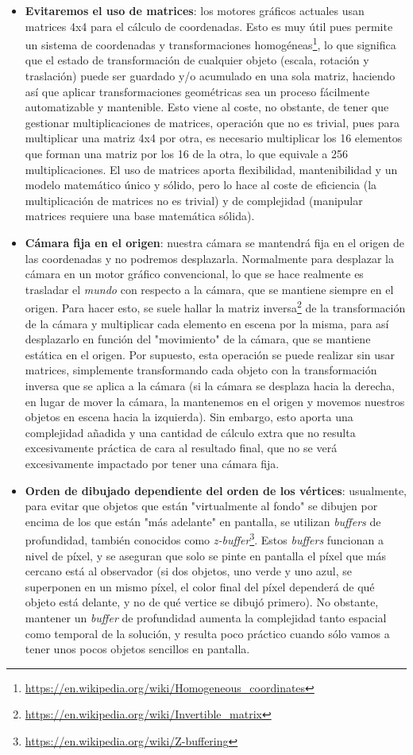 \begin{itemize}
	\item \textbf{Evitaremos el uso de matrices}: los motores gráficos actuales usan matrices 4x4 para el cálculo de coordenadas. Esto es muy útil pues permite un sistema de coordenadas y transformaciones homogéneas\footnote{\url{https://en.wikipedia.org/wiki/Homogeneous_coordinates}}, lo que significa que el estado de transformación de cualquier objeto (escala, rotación y traslación) puede ser guardado y/o acumulado en una sola matriz, haciendo así que aplicar transformaciones geométricas sea un proceso fácilmente automatizable y mantenible. Esto viene al coste, no obstante, de tener que gestionar multiplicaciones de matrices, operación que no es trivial, pues para multiplicar una matriz 4x4 por otra, es necesario multiplicar los 16 elementos que forman una matriz por los 16 de la otra, lo que equivale a 256 multiplicaciones. El uso de matrices aporta flexibilidad, mantenibilidad y un modelo matemático único y sólido, pero lo hace al coste de eficiencia (la multiplicación de matrices no es trivial) y de complejidad (manipular matrices requiere una base matemática sólida).
	\item \textbf{Cámara fija en el origen}: nuestra cámara se mantendrá fija en el origen de las coordenadas y no podremos desplazarla. Normalmente para desplazar la cámara en un motor gráfico convencional, lo que se hace realmente es trasladar el \emph{mundo} con respecto a la cámara, que se mantiene siempre en el origen. Para hacer esto, se suele hallar la matriz inversa\footnote{\url{https://en.wikipedia.org/wiki/Invertible_matrix}} de la transformación de la cámara y multiplicar cada elemento en escena por la misma, para así desplazarlo en función del "movimiento" de la cámara, que se mantiene estática en el origen. Por supuesto, esta operación se puede realizar sin usar matrices, simplemente transformando cada objeto con la transformación inversa que se aplica a la cámara (si la cámara se desplaza hacia la derecha, en lugar de mover la cámara, la mantenemos en el origen y movemos nuestros objetos en escena hacia la izquierda). Sin embargo, esto aporta una complejidad añadida y una cantidad de cálculo extra que no resulta excesivamente práctica de cara al resultado final, que no se verá excesivamente impactado por tener una cámara fija.
	\item \textbf{Orden de dibujado dependiente del orden de los vértices}: usualmente, para evitar que objetos que están "virtualmente al fondo" se dibujen por encima de los que están "más adelante" en pantalla, se utilizan \emph{buffers} de profundidad, también conocidos como \emph{z-buffer}\footnote{\url{https://en.wikipedia.org/wiki/Z-buffering}}. Estos \emph{buffers} funcionan a nivel de píxel, y se aseguran que solo se pinte en pantalla el píxel que más cercano está al observador (si dos objetos, uno verde y uno azul, se superponen en un mismo píxel, el color final del píxel dependerá de qué objeto está delante, y no de qué vertice se dibujó primero). No obstante, mantener un \emph{buffer} de profundidad aumenta la complejidad tanto espacial como temporal de la solución, y resulta poco práctico cuando sólo vamos a tener unos pocos objetos sencillos en pantalla.

\end{itemize}
